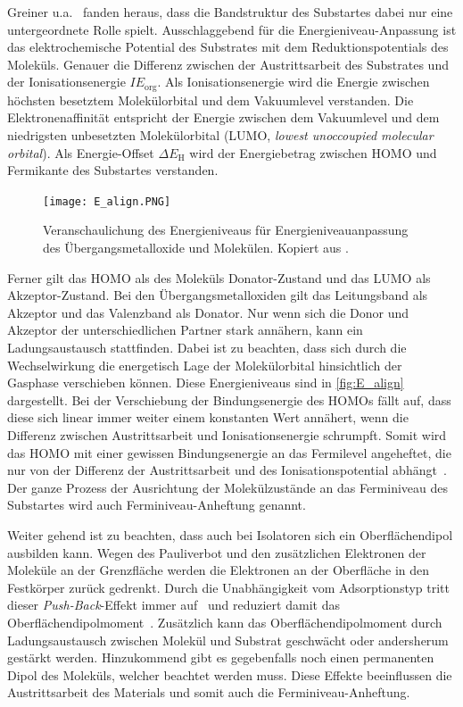             Greiner u.a.~\cite{IF_3} fanden heraus, dass die Bandstruktur des Substartes dabei nur eine untergeordnete Rolle spielt.
            Ausschlaggebend für die Energieniveau-Anpassung ist das elektrochemische Potential des Substrates mit dem Reduktionspotentials des Moleküls.
            Genauer die Differenz zwischen der Austrittsarbeit des Substrates und der Ionisationsenergie $IE_\text{org}$.
            Als Ionisationsenergie wird die Energie zwischen höchsten besetztem Molekülorbital und dem Vakuumlevel verstanden.
            Die Elektronenaffinität entspricht der Energie zwischen dem Vakuumlevel und dem niedrigsten unbesetzten Molekülorbital (LUMO, \textit{lowest unoccoupied molecular orbital}).
            Als Energie-Offset $\Delta E_\text{H}$ wird der Energiebetrag zwischen HOMO und Fermikante des Substartes verstanden.

            \begin{figure}
                \centering
                \texttt{[image: E\_align.PNG]}
                \caption{Veranschaulichung des Energieniveaus für Energieniveauanpassung des Übergangsmetalloxide und Molekülen. Kopiert aus \cite{IF_3}.}
                \label{fig:E_align}
            \end{figure}
            \textbf{\cite{IF_3}}
            Ferner gilt das HOMO als des Moleküls Donator-Zustand und das LUMO als Akzeptor-Zustand.
            Bei den Übergangsmetalloxiden gilt das Leitungsband als Akzeptor und das Valenzband als Donator. 
            Nur wenn sich die Donor und Akzeptor der unterschiedlichen Partner stark annähern, kann ein Ladungsaustausch stattfinden.
            Dabei ist zu beachten, dass sich durch die Wechselwirkung die energetisch Lage der Molekülorbital hinsichtlich der Gasphase verschieben können.
            Diese Energieniveaus sind in \autoref{fig:E_align} dargestellt.
            Bei der Verschiebung der Bindungsenergie des HOMOs fällt auf, dass diese sich linear immer weiter einem konstanten Wert annähert, wenn die Differenz zwischen Austrittsarbeit und Ionisationsenergie schrumpft.
            Somit wird das HOMO mit einer gewissen Bindungsenergie an das Fermilevel angeheftet, die nur von der Differenz der Austrittsarbeit und des Ionisationspotential abhängt~\cite{IF_3}.
            Der ganze Prozess der Ausrichtung der Molekülzustände an das Ferminiveau des Substartes wird auch Ferminiveau-Anheftung genannt.

            Weiter gehend ist zu beachten, dass auch bei Isolatoren sich ein Oberflächendipol ausbilden kann.
            Wegen des Pauliverbot und den zusätzlichen Elektronen der Moleküle an der Grenzfläche werden die Elektronen an der Oberfläche in den Festkörper zurück gedrenkt.
            Durch die Unabhängigkeit vom Adsorptionstyp tritt dieser \textit{Push-Back}-Effekt immer auf~\cite{IF_4} und reduziert damit das Oberflächendipolmoment~\cite{IF_1}.
            Zusätzlich kann das Oberflächendipolmoment durch Ladungsaustausch zwischen Molekül und Substrat geschwächt oder andersherum gestärkt werden.
            Hinzukommend gibt es gegebenfalls noch einen permanenten Dipol des Moleküls, welcher beachtet werden muss.
            Diese Effekte beeinflussen die Austrittsarbeit des Materials und somit auch die Ferminiveau-Anheftung.

